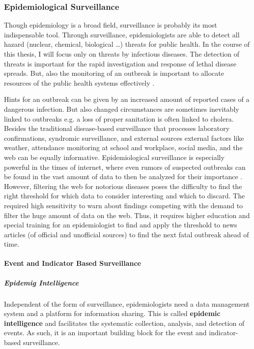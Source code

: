 \subsubsection{Epidemiological Surveillance}

Though epidemiology is a broad field, surveillance is probably its most indispensable tool. Through surveillance,
epidemiologists are able to detect all hazard (nuclear, chemical, biological \ldots) threats for public health. In the course of this thesis, I will focus only on threats by infectious diseases. The detection of threats is important for the rapid investigation and response of lethal disease spreads. But, also the monitoring of an outbreak is important to allocate resources of the public health systems effectively \cite{EarlyDetection}.

Hints for an outbreak can be given by an increased amount of reported cases of a dangerous infection. But also changed circumstances are sometimes inevitably linked to outbreaks e.g. a loss of proper sanitation is often linked to cholera. Besides the traditional disease-based surveillance that processes laboratory confirmations, syndromic surveillance, and external sources external factors like weather, attendance monitoring at school and workplace, social media, and the web\cite{EarlyDetection} can be equally informative. Epidemiological surveillance is especially powerful in the times of internet, where even rumors of suspected outbreaks can be found in the vast amount of data to then be analyzed for their importance \cite{EpiSurv}. However, filtering the web for notorious diseases poses the difficulty to find the right threshold for which data to consider interesting and which to discard. The required high sensitivity to warn about findings competing with the demand to filter the huge amount of data on the web. Thus, it requires higher education and special training for an epidemiologist to find and apply the threshold to news articles (of official and unofficial sources) to find the next fatal outbreak ahead of time.



\paragraph{Event and Indicator Based Surveillance}

\subparagraph{Epidemig Intelligence}
Independent of the form of surveillance, epidemiologists need a data management system and a platform for information sharing. This is called \textbf{epidemic intelligence} and facilitates the systematic collection, analysis, and detection of events\cite{EarlyDetection}. As such, it is an important building block for the event and indicator-based surveillance.

